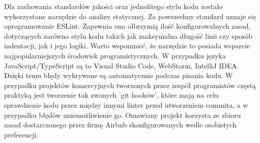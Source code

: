\documentclass[skorowidz,skroty]{dyplomWEZUT}
\begin{document}
Dla zachowania standardów jakości oraz jednolitego stylu kodu zostało wykorzystane narzędzie do analizy statycznej. Za powszechny standard uznaje się oprogramowanie ESLint. Zapewnia ono olbrzymią ilość konfigurowalnych zasad, dotyczących zarówno stylu kodu takich jak maksymalna długość linii czy sposób indentacji, jak i jego logiki. Warto wspomnieć, że narzędzie to posiada wsparcie najpopularniejszych środowisk programistycznych. W przypadku języka JavaScript/TypeScript są to Visual Studio Code, WebStorm, IntelliJ IDEA. Dzięki temu błędy wykrywane są automatycznie podczas pisania kodu. W przypadku projektów komercyjnych tworzonych przez zespół programistów częstą praktyką jest tworzenie tak zwanych 'git hooków', które mają na celu sprawdzenie kodu przez między innymi linter przed utworzeniem commita, a w przypadku błędów uniemożliwienie go. Omawiany projekt korzysta ze zbioru zasad dostarczonego przez firmę Airbnb skonfigurowanych wedle osobistych preferencji.
\end{document}
